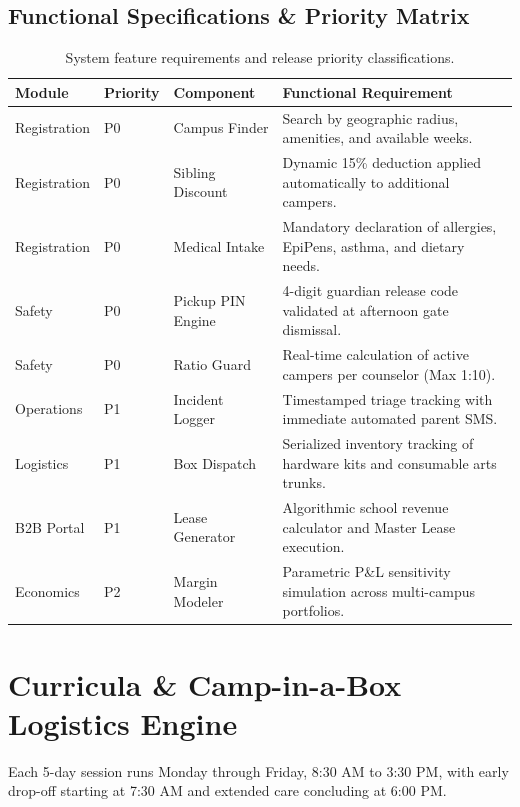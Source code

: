 \documentclass[11pt,a4paper]{article}
\begin{document}
\subsection{Functional Specifications \& Priority Matrix}

\begin{table}[h!]
\centering
\small
\begin{tabular}{lll p{7.5cm}}
\toprule
\textbf{Module} & \textbf{Priority} & \textbf{Component} & \textbf{Functional Requirement} \\
\midrule
Registration & P0 & Campus Finder & Search by geographic radius, amenities, and available weeks. \\
Registration & P0 & Sibling Discount & Dynamic 15\% deduction applied automatically to additional campers. \\
Registration & P0 & Medical Intake & Mandatory declaration of allergies, EpiPens, asthma, and dietary needs. \\
Safety & P0 & Pickup PIN Engine & 4-digit guardian release code validated at afternoon gate dismissal. \\
Safety & P0 & Ratio Guard & Real-time calculation of active campers per counselor (Max 1:10). \\
Operations & P1 & Incident Logger & Timestamped triage tracking with immediate automated parent SMS. \\
Logistics & P1 & Box Dispatch & Serialized inventory tracking of hardware kits and consumable arts trunks. \\
B2B Portal & P1 & Lease Generator & Algorithmic school revenue calculator and Master Lease execution. \\
Economics & P2 & Margin Modeler & Parametric P\&L sensitivity simulation across multi-campus portfolios. \\
\bottomrule
\end{tabular}
\caption{System feature requirements and release priority classifications.}
\label{tab:prd_matrix}
\end{table}

\section{Curricula \& Camp-in-a-Box Logistics Engine}

Each 5-day session runs Monday through Friday, 8:30 AM to 3:30 PM, with early drop-off starting at 7:30 AM and extended care concluding at 6:00 PM.
\end{document}

